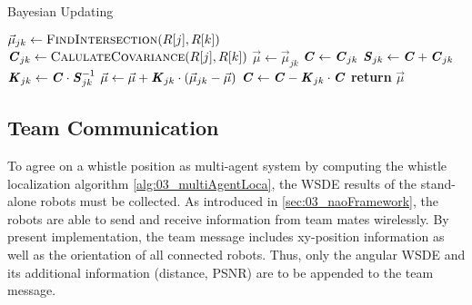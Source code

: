 \begin{algorithm}[H]
    \caption{Bayesian Updating}\label{alg:03_multiAgentLoca}
    \begin{algorithmic}[1]
                    \State $\vec{\mu}_{jk} \gets \Call{FindIntersection}{R[j], R[k]}$
                    \State $\textbf{\textit{C}}_{jk} \gets \Call{CalulateCovariance}{R[j], R[k]}$
                        \State $\vec{\mu} \gets \vec{\mu}_{jk}$
                        \State $\textbf{\textit{C}} \gets \textbf{\textit{C}}_{jk}$
                        \State $\textbf{\textit{S}}_{jk} \gets \textbf{\textit{C}} + \textbf{\textit{C}}_{jk}$
                        \State $\textbf{\textit{K}}_{jk} \gets \textbf{\textit{C}} \cdot \textbf{\textit{S}}_{jk}^{-1}$
                        \State $\vec{\mu} \gets \vec{\mu} + \textbf{\textit{K}}_{jk} \cdot (\vec{\mu}_{jk} - \vec{\mu})$
                        \State $\textbf{\textit{C}} \gets \textbf{\textit{C}} - \textbf{\textit{K}}_{jk} \cdot \textbf{\textit{C}}$
                    \EndIf
                \EndFor
            \EndFor
            \State \textbf{return} $\vec{\mu}$
        \EndProcedure\vspace{12pt}
    \end{algorithmic}
\end{algorithm}

\subsection{Team Communication}
\label{subsec:03_teamCommunication}

To agree on a whistle position as multi-agent system by computing the whistle
localization algorithm \cref{alg:03_multiAgentLoca}, the \ac{WSDE} results of the
stand-alone robots must be collected.
As introduced in \cref{sec:03_naoFramework}, the robots are able to send and receive
information from team mates wirelessly.
By present implementation, the team message includes xy-position information as well as
the orientation of all connected robots.
Thus, only the angular \ac{WSDE} and its additional information (distance, \ac{PSNR}) are to be
appended to the team message.

